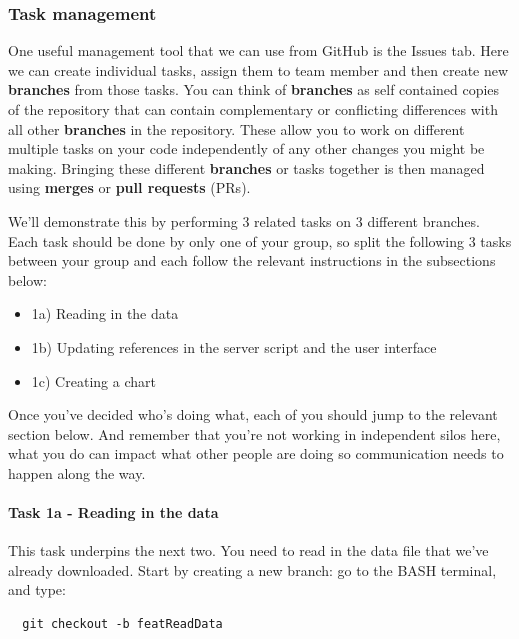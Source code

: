 \documentclass[
  12pt,
]{article}
\providecommand{\tightlist}{%
  \setlength{\itemsep}{0pt}\setlength{\parskip}{0pt}}
\begin{document}
\hypertarget{task-management}{%
\subsubsection{Task management}\label{task-management}}

One useful management tool that we can use from GitHub is the Issues
tab. Here we can create individual tasks, assign them to team member and
then create new \textbf{branches} from those tasks. You can think of
\textbf{branches} as self contained copies of the repository that can
contain complementary or conflicting differences with all other
\textbf{branches} in the repository. These allow you to work on
different multiple tasks on your code independently of any other changes
you might be making. Bringing these different \textbf{branches} or tasks
together is then managed using \textbf{merges} or \textbf{pull requests}
(PRs).

We'll demonstrate this by performing 3 related tasks on 3 different
branches. Each task should be done by only one of your group, so split
the following 3 tasks between your group and each follow the relevant
instructions in the subsections below:

\begin{itemize}
\tightlist
\item
  1a) Reading in the data
\item
  1b) Updating references in the server script and the user interface
\item
  1c) Creating a chart
\end{itemize}

Once you've decided who's doing what, each of you should jump to the
relevant section below. And remember that you're not working in
independent silos here, what you do can impact what other people are
doing so communication needs to happen along the way.

\hypertarget{task-1a---reading-in-the-data}{%
\paragraph{Task 1a - Reading in the
data}\label{task-1a---reading-in-the-data}}

This task underpins the next two. You need to read in the data file that
we've already downloaded. Start by creating a new branch: go to the BASH
terminal, and type:

\begin{verbatim}
  git checkout -b featReadData
\end{verbatim}
\end{document}
